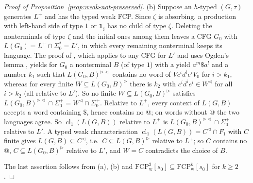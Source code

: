 \documentclass[11pt]{article}
\numberwithin{equation}{section}
\theoremstyle{plain}
\theoremstyle{definition}
\theoremstyle{remark}
\theoremstyle{plain}
\newcommand{\R}{^{\rhd}}
\newcommand{\Lc}{^{\lhd}}
\newcommand{\RL}{^{\rhd\lhd}}
\newcommand{\cl}{\operatorname{cl}}
\newcommand{\one}{\mathbf 1_\sharp}
\newcommand{\tFCP}[3]{\mathrm{FCP}^{#1}_{\mathrm{#2}}[#3]}
\begin{document}
\begin{proof}[Proof of Proposition~\ref{prop:weak-not-preserved}]
(b) Suppose an $h$-typed $(G,\tau)$ generates $L^+$ and has the typed weak
FCP.  Since $\zeta$ is absorbing, a production with left-hand side of type
$1$ or $\one$ has no child of type $\zeta$.  Deleting the nonterminals of
type $\zeta$ and the initial ones among them leaves a CFG $G_0$ with
$L(G_0)=L^+\cap\Sigma_0^*=L'$, in which every remaining nonterminal keeps its
language.  The proof of \citet[Lemma~13]{ky2017}, which applies to any CFG
for $L'$ and uses Ogden's lemma \citep{ogden1968}, yields for $G_0$ a
nonterminal $B$ (of type $1$) with a yield $a^{m}\$a^{l}$ and a number $k_1$
such that $L(G_0,B)\RL$ contains no word of $Vc^id^ie^iV_0$
for $i>k_1$, whereas for every finite $W\subseteq L(G_0,B)\R$ there is $k_2$
with $c^id^ie^i\in W\Lc$ for all $i>k_2$ (all relative to $L'$).  So no finite
$W\subseteq L(G_0,B)\R$ satisfies
$L(G_0,B)\RL\cap\Sigma_0^+=W\Lc\cap\Sigma_0^+$.  Relative to
$L^+$, every context of $L(G,B)$ accepts a word containing $\$$, hence
contains no $@$; on words without $@$ the two languages agree.  So
$\cl_1(L(G,B))$ relative to $L^+$ is $L(G_0,B)\RL\cap\Sigma_0^+$ relative to
$L'$.  A typed weak characterisation $\cl_1(L(G,B))=C\Lc\cap F_1$ with $C$
finite gives $L(G,B)\subseteq C\Lc$, i.e.\ $C\subseteq L(G,B)\R$ relative to
$L^+$; so $C$ contains no $@$, $C\subseteq L(G_0,B)\R$ relative to $L'$, and
$W=C$ contradicts the choice of $B$.

The last assertion follows from (a), (b) and
$\tFCP2{w}{s_0}\subseteq\tFCP{k}{w}{s_0}$ for $k\ge2$.
\end{proof}
\end{document}
